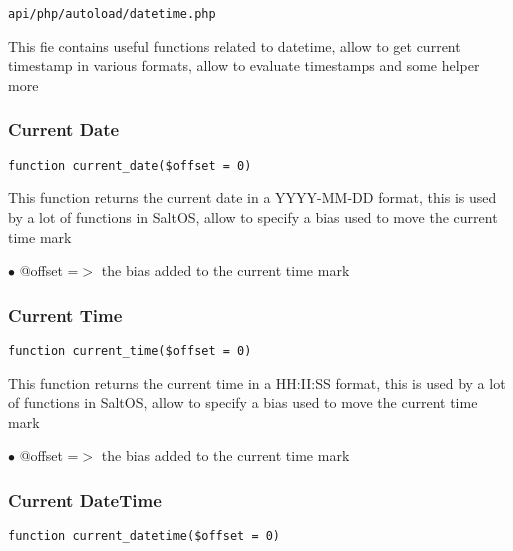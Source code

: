 \documentclass[a4paper]{article}
\begin{document}
\begin{lstlisting}
api/php/autoload/datetime.php
\end{lstlisting}

This fie contains useful functions related to datetime, allow to get current timestamp in various
formats, allow to evaluate timestamps and some helper more

\hypertarget{toc98}{}
\subsubsection{Current Date}

\begin{lstlisting}
function current_date($offset = 0)
\end{lstlisting}

This function returns the current date in a YYYY-MM-DD format, this is used
by a lot of functions in SaltOS, allow to specify a bias used to move the
current time mark

\begin{compactitem}
\item[\color{myblue}$\bullet$] @offset =$>$ the bias added to the current time mark
\end{compactitem}

\hypertarget{toc99}{}
\subsubsection{Current Time}

\begin{lstlisting}
function current_time($offset = 0)
\end{lstlisting}

This function returns the current time in a HH:II:SS format, this is used
by a lot of functions in SaltOS, allow to specify a bias used to move the
current time mark

\begin{compactitem}
\item[\color{myblue}$\bullet$] @offset =$>$ the bias added to the current time mark
\end{compactitem}

\hypertarget{toc100}{}
\subsubsection{Current DateTime}

\begin{lstlisting}
function current_datetime($offset = 0)
\end{lstlisting}
\end{document}

